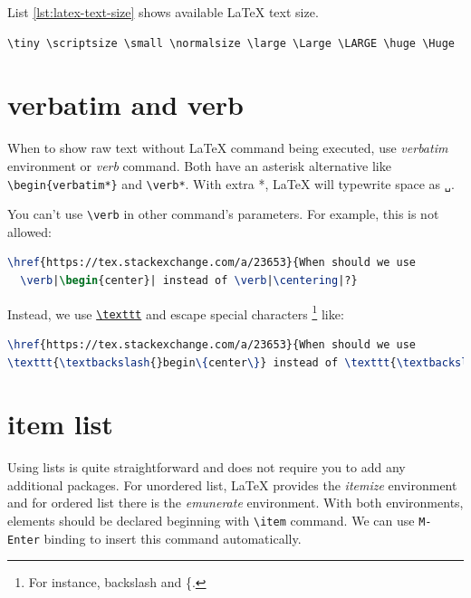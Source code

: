 List \ref{lst:latex-text-size} shows available \LaTeX{} text size.

\begin{lstlisting}[language=Tex,caption={LaTeX Text Size},label={lst:latex-text-size}]
\tiny \scriptsize \small \normalsize \large \Large \LARGE \huge \Huge
\end{lstlisting}

\section{verbatim and verb}
\label{sec:verbatim-verb}

When to show raw text without \LaTeX{} command being executed, use
\textit{verbatim} environment or \textit{verb} command. Both have
an asterisk alternative like \verb|\begin{verbatim*}| and
  \verb|\verb*|. With extra *, \LaTeX{} will typewrite space as
\texttt{␣}.

You can't use \texttt{\textbackslash{}verb} in other command's
parameters. For example, this is not allowed:

\begin{lstlisting}[language=TeX,caption={Illegal verb}]
\href{https://tex.stackexchange.com/a/23653}{When should we use
  \verb|\begin{center}| instead of \verb|\centering|?}
\end{lstlisting}

Instead, we use
\href{https://tex.stackexchange.com/q/2790}{\texttt{\textbackslash{}texttt}}
and escape special characters \footnote{For instance, backslash
and \{.} like:

\begin{lstlisting}[language=TeX,caption={texttt}]
\href{https://tex.stackexchange.com/a/23653}{When should we use
\texttt{\textbackslash{}begin\{center\}} instead of \texttt{\textbackslash{}centering}?}
\end{lstlisting}

\section{item list}
\label{sec:item-list}

Using lists is quite straightforward and does not require you to
add any additional packages. For unordered list, \LaTeX{} provides
the \textit{itemize} environment and for ordered list there is the
\textit{emunerate} environment. With both environments, elements
should be declared beginning with \verb|\item| command. We can use
\verb|M-Enter| binding to insert this command automatically.

